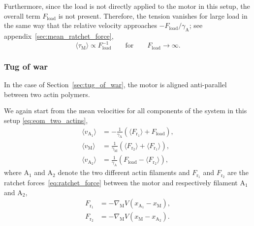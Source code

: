\documentclass[aps,pre,twocolumn,showpacs,showkeys,superscriptaddress,floatfix]{revtex4-1}
\begin{document}
Furthermore, since the load is not directly applied to the motor in this setup, the overall term $F_\text{load}$ is not present. 
Therefore, the tension vanishes for large load in the same way that the relative velocity approaches $-F_\text{load} / \gamma_\text{A}$; see appendix~\ref{sec:mean_ratchet_force},
\begin{equation}
\langle \tau_\text{M} \rangle 
\propto
F_\text{load}^{-1}
\qquad\text{for}\qquad
F_\text{load} \to \infty 
.
\label{eq:tension_load_on_polymer_large}
\end{equation}


\subsubsection{Tug of war}
In the case of Section~\ref{sec:tug_of_war}, the motor is aligned anti-parallel between two actin polymers. 

We again start from the mean velocities for all components of the system in this setup \eqref{eq:eom_two_actins},
\begin{align*}
\langle v_{\text{A}_1} \rangle &= - \frac{1}{\gamma_\text{A} } \left( \langle F_{\text{r}_1} \rangle + F_\text{load} \right) , \\
\langle v_\text{M} \rangle &= \frac{1}{\gamma_\text{M} } \left( \langle F_{\text{r}_2} \rangle + \langle F_{\text{r}_1} \rangle \right) , \\
\langle v_{\text{A}_2} \rangle &= \frac{1}{ \gamma_\text{A} } \left( F_\text{load} - \langle F_{\text{r}_2} \rangle \right) ,
\end{align*}
where ${\text{A}_1}$ and ${\text{A}_2}$ denote the two different actin filaments 
and $F_{\text{r}_1}$ and $F_{\text{r}_2}$ are the ratchet forces~\eqref{eq:ratchet_force} between the motor and respectively filament ${\text{A}_1}$ and ${\text{A}_2}$,
\begin{align*}
F_{\text{r}_1} &= - \nabla_\text{M} V( x_{\text{A}_1} - x_\text{M} ) , 
\\
F_{\text{r}_2} &= - \nabla_\text{M} V( x_\text{M} - x_{\text{A}_2} ) .
\end{align*} 
\end{document}
